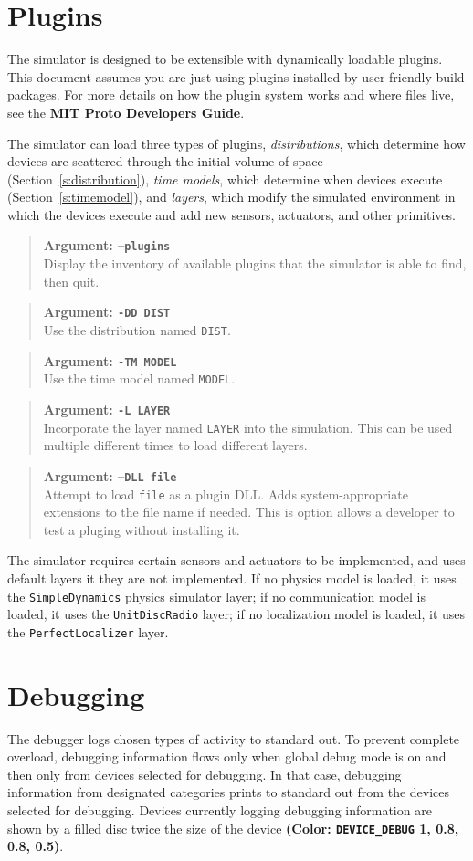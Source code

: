 \documentclass{article}
\newcommand\var[1]{{\tt #1}}
\newcommand\simarg[2]{\begin{quote} {\bf Argument: \var{#1}} \\ #2 \end{quote}}
\newcommand\color[5]{{\bf (Color: {\tt #1} #2, #3, #4, #5)}} %
\begin{document}
\section{Plugins}

The simulator is designed to be extensible with dynamically loadable
plugins.  This document assumes you are just using plugins installed
by user-friendly build packages.  For more details on how the plugin
system works and where files live, see the {\bf MIT Proto Developers
  Guide}.

The simulator can load three types of plugins, {\em distributions},
which determine how devices are scattered through the initial volume
of space (Section~\ref{s:distribution}), {\em time models}, which
determine when devices execute (Section~\ref{s:timemodel}), and {\em
  layers}, which modify the simulated environment in which the devices
execute and add new sensors, actuators, and other primitives.

\simarg{--plugins}{Display the inventory of available plugins that the
  simulator is able to find, then quit.}
\simarg{-DD DIST}{Use the distribution named \var{DIST}.}
\simarg{-TM MODEL}{Use the time model named \var{MODEL}.}
\simarg{-L LAYER}{Incorporate the layer named \var{LAYER} into the
  simulation.  This can be used multiple different times to load
  different layers.}
\simarg{--DLL file}{Attempt to load \var{file} as a plugin DLL. Adds
  system-appropriate extensions to the file name if needed.  This is
  option allows a developer to test a pluging without installing it.}

The simulator requires certain sensors and actuators to be
implemented, and uses default layers it they are not implemented.  If
no physics model is loaded, it uses the \var{SimpleDynamics} physics
simulator layer; if no communication model is loaded, it uses the
\var{UnitDiscRadio} layer; if no localization model is loaded, it uses
the \var{PerfectLocalizer} layer.

\section{Debugging}

The debugger logs chosen types of activity to standard out.  To
prevent complete overload, debugging information flows only when
global debug mode is on and then only from devices selected for
debugging.  In that case, debugging information from designated
categories prints to standard out from the devices selected for debugging.
Devices currently logging debugging information are shown by a filled
disc twice the size of the device
\color{DEVICE\_DEBUG}{1}{0.8}{0.8}{0.5}.
\end{document}
